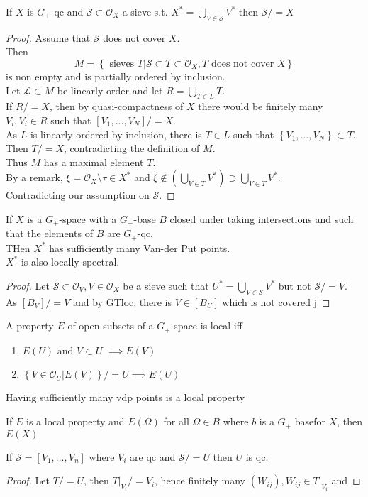 \documentclass[../main.tex]{subfiles}
\begin{document}
\begin{lemma}
	If $X$ is $G_+$-qc and $ \mathcal{S} \subset \mathcal{O}_X$ a sieve s.t. $X^{\ast}= \bigcup_{V\in \mathcal{S}} V^{\ast}$ then $\mathcal{S} /= X$
\end{lemma}
\begin{proof}
Assume that $ \mathcal{S}$ does not cover $X$.\\
Then
\[ 
	M = \left\{ \text{ sieves } T | \mathcal{S} \subset T \subset \mathcal{O}_X, T \text{ does not cover } X \right\} 
\]
is non empty and is partially ordered by inclusion.\\
Let $ \mathcal{L} \subset M$ be linearly order and let $R= \bigcup_{T \in L} T$.\\
If $R /= X$, then by quasi-compactness of $X$ there would be finitely many $V_i, V_i \in R$ such that $ [ V_1, \ldots, V_N] /= X$.\\
As $L$ is linearly ordered by inclusion, there is $T\in L$ such that $ \left\{ V_1,\ldots,V_N \right\} \subset T$. Then $T /= X$, contradicting the definition of $M$.\\
Thus $M$ has a maximal element $T$.\\
By a remark, $\xi = \mathcal{O}_X \setminus \tau \in X^{\ast} $ and $\xi \notin ( \bigcup_{V\in T} V^{\ast}) \supset \bigcup_{V \in T} V^{\ast}$.\\
Contradicting our assumption on $ \mathcal{S}$.
\end{proof}
\begin{propo}
If $X$ is a $G_+$-space with a $G_+$-base $B$ closed under taking intersections and such that the elements of $B$ are $G_+$-qc.\\
THen $X^{\ast}$ has sufficiently many Van-der Put points.\\
$X^{\ast}$ is also locally spectral.
\end{propo}
\begin{proof}
Let $ \mathcal{S} \subset \mathcal{O}_V, V \in \mathcal{O}_X$ be a sieve such that $U^{\ast}=\bigcup_{V\in \mathcal{S}} V^{\ast}$ but not $\mathcal{S} /= V$.\\
As $ [ B_V] /= V$ and by GTloc, there is $V \in [ B_U] $ which is not covered j
\end{proof}

\begin{defn}
A property $E$ of open subsets of a $G_+$-space is local iff
\begin{enumerate}
\item $E( U) $ and $V \subset U$ $\implies E( V) $ 
\item $ \left\{ V \in \mathcal{O}_U| E( V)  \right\} /= U \implies E( U) $ 
\end{enumerate}
\end{defn}
\begin{thm}
Having sufficiently many vdp points is a local property
\end{thm}
\begin{thm}
If $E$ is a local property and $E( \Omega) $ for all $\Omega \in B$ where $b$ is a $G_+ $ basefor $X$, then $E( X) $ 
\end{thm}

\begin{thm}
	If $ \mathcal{S}= [ V_1,\ldots,V_n] $ where $V_i$ are qc and $ \mathcal{S} /= U$ then $U$ is qc.
\end{thm}
\begin{proof}
Let $T /= U$, then $T|_{V_i} /= V_i$, hence finitely many $( W_{ij} ) , W_{ij } \in T|_{V_i} $ and 
\end{proof}
\end{document}
